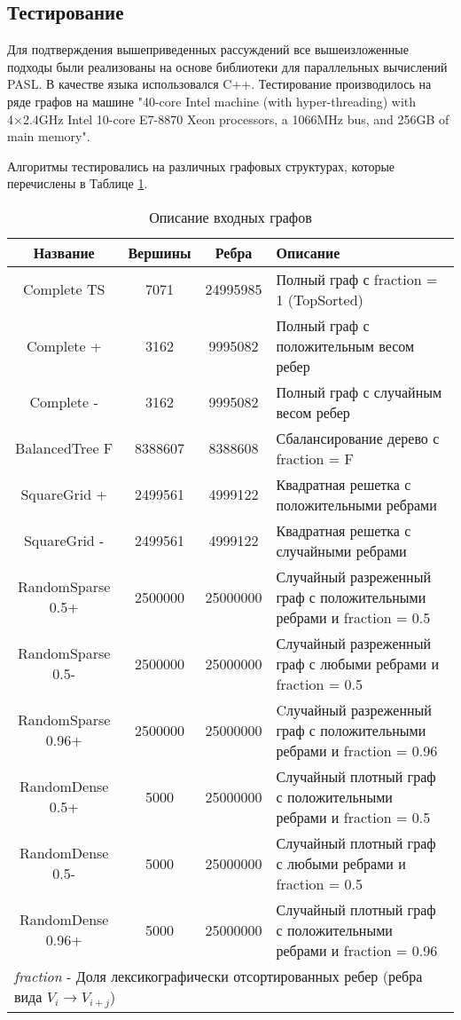 \FloatBarrier
\subsection{Тестирование}

Для подтверждения вышеприведенных рассуждений все вышеизложенные подходы были реализованы на основе библиотеки для параллельных вычислений PASL. В качестве языка использовался C++. Тестирование производилось на ряде графов на машине "40-core Intel machine (with hyper-threading) with 4×2.4GHz Intel
10-core E7-8870 Xeon processors, a 1066MHz bus, and 256GB of
main memory". 

Алгоритмы тестировались на различных графовых структурах, которые перечислены в Таблице \ref{bf_algo_comparison}. 
\FloatBarrier
\begin{table}[H]
\centering
\begin{tabular}{c | c | c | l}  
Название & Вершины & Ребра & Описание\\
\hline\hline
Complete TS & 7071 & 24995985 & Полный граф с fraction = 1 (TopSorted)\\  
Complete + & 3162 & 9995082 & Полный граф с положительным весом ребер \\  
Complete - & 3162 & 9995082 & Полный граф с случайным весом ребер \\  
BalancedTree F & 8388607 & 8388608 & Сбалансирование дерево с fraction = F \\  
SquareGrid + & 2499561 & 4999122 & Квадратная решетка с положительными ребрами \\  
SquareGrid - & 2499561 & 4999122 & Квадратная решетка с случайными ребрами \\  
RandomSparse 0.5+ & 2500000 & 25000000 & \pbox{9cm}{Случайный разреженный граф с положительными ребрами и fraction = 0.5\\}  \\  
RandomSparse 0.5- & 2500000 & 25000000 & \pbox{9cm}{Случайный разреженный граф с любыми ребрами и fraction = 0.5\\}  \\  
RandomSparse 0.96+ & 2500000 & 25000000 & \pbox{9cm}{Cлучайный разреженный граф с положительными ребрами и fraction = 0.96\\} \\  
RandomDense 0.5+ & 5000 & 25000000 & \pbox{9cm}{Случайный плотный граф с положительными ребрами и fraction = 0.5\\}  \\  
RandomDense 0.5- & 5000 & 25000000 & \pbox{9cm}{Случайный плотный граф с любыми ребрами и fraction = 0.5\\}  \\  
RandomDense 0.96+ & 5000 & 25000000 & \pbox{9cm}{Случайный плотный граф с положительными ребрами и fraction = 0.96\\}  \\  
\hline
\multicolumn{4}{l}{\footnotesize \textit{fraction} - Доля лексикографически отсортированных ребер (ребра вида $V_i \rightarrow V_{i+j}$) }\\
\end{tabular}

\caption{Описание входных графов}
\label{bf_algo_comparison}
\end{table}
